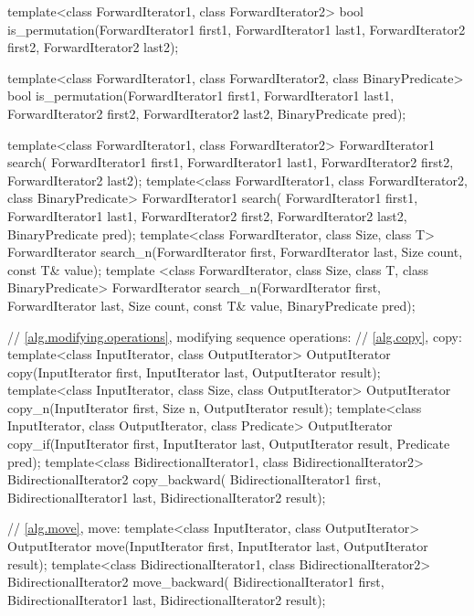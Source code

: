 \begin{codeblock}
{  template<class ForwardIterator1, class ForwardIterator2>
    bool is_permutation(ForwardIterator1 first1, ForwardIterator1 last1,
                        ForwardIterator2 first2, ForwardIterator2 last2);

  template<class ForwardIterator1, class ForwardIterator2,
                      class BinaryPredicate>
    bool is_permutation(ForwardIterator1 first1, ForwardIterator1 last1,
                        ForwardIterator2 first2, ForwardIterator2 last2,
                        BinaryPredicate pred);

  template<class ForwardIterator1, class ForwardIterator2>
    ForwardIterator1 search(
      ForwardIterator1 first1, ForwardIterator1 last1,
      ForwardIterator2 first2, ForwardIterator2 last2);
  template<class ForwardIterator1, class ForwardIterator2,
     class BinaryPredicate>
    ForwardIterator1 search(
      ForwardIterator1 first1, ForwardIterator1 last1,
      ForwardIterator2 first2, ForwardIterator2 last2,
      BinaryPredicate pred);
  template<class ForwardIterator, class Size, class T>
    ForwardIterator search_n(ForwardIterator first, ForwardIterator last,
                             Size count, const T& value);
  template
   <class ForwardIterator, class Size, class T, class BinaryPredicate>
    ForwardIterator search_n(ForwardIterator first, ForwardIterator last,
                             Size count, const T& value,
                             BinaryPredicate pred);

  // \ref{alg.modifying.operations}, modifying sequence operations:
  // \ref{alg.copy}, copy:
  template<class InputIterator, class OutputIterator>
    OutputIterator copy(InputIterator first, InputIterator last,
                        OutputIterator result);
  template<class InputIterator, class Size, class OutputIterator>
    OutputIterator copy_n(InputIterator first, Size n,
                          OutputIterator result);
  template<class InputIterator, class OutputIterator, class Predicate>
    OutputIterator copy_if(InputIterator first, InputIterator last,
                          OutputIterator result, Predicate pred);
  template<class BidirectionalIterator1, class BidirectionalIterator2>
    BidirectionalIterator2 copy_backward(
      BidirectionalIterator1 first, BidirectionalIterator1 last,
      BidirectionalIterator2 result);

  // \ref{alg.move}, move:
  template<class InputIterator, class OutputIterator>
    OutputIterator move(InputIterator first, InputIterator last,
                        OutputIterator result);
  template<class BidirectionalIterator1, class BidirectionalIterator2>
    BidirectionalIterator2 move_backward(
      BidirectionalIterator1 first, BidirectionalIterator1 last,
      BidirectionalIterator2 result);

}
\end{codeblock}
